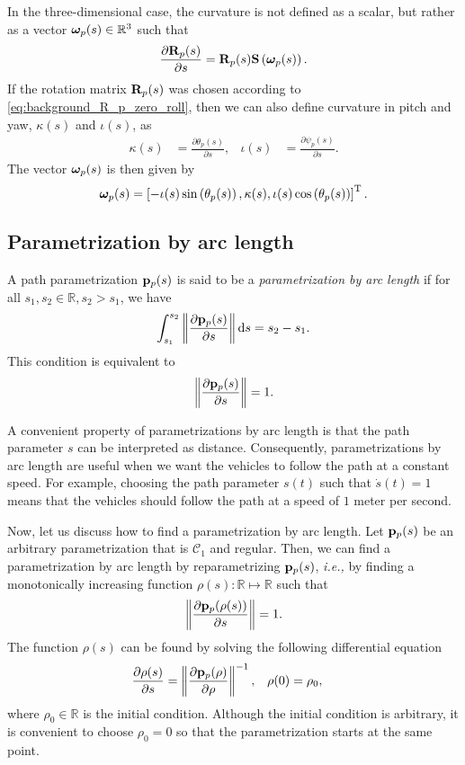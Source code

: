 In the three-dimensional case, the curvature is not defined as a scalar, but rather as a vector $\bm{\omega}_p(s) \in \mathbb{R}^3$ such that
\begin{equation}
    \frac{\partial \mathbf{R}_p(s)}{\partial s} = \mathbf{R}_p(s) \mathbf{S}\left(\bm{\omega}_p(s)\right).
\end{equation}
If the rotation matrix $\mathbf{R}_p(s)$ was chosen according to \eqref{eq:background_R_p_zero_roll}, then we can also define curvature in pitch and yaw, $\kappa(s)$ and $\iota(s)$, as
\begin{align}
    \kappa(s) &= \frac{\partial \theta_{p}(s)}{\partial s}, &
    \iota(s) &= \frac{\partial \psi_{p}(s)}{\partial s}.
\end{align}
The vector $\bm{\omega}_p(s)$ is then given by
\begin{equation}
    \bm{\omega}_p(s) = \left[-\iota(s)\sin\left(\theta_{p}(s)\right), \kappa(s), \iota(s)\cos\left(\theta_{p}(s)\right)\right]^{\mathrm{T}}.
\end{equation}

\subsection*{Parametrization by arc length}
A path parametrization $\mathbf{p}_p(s)$ is said to be a \emph{parametrization by arc length} if for all $s_1, s_2 \in \mathbb{R}, s_2 > s_1$, we have
\begin{equation}
    \int_{s_1}^{s_2} \left\|\frac{\partial \mathbf{p}_p(s)}{\partial s}\right\| {\rm d}s = s_2 - s_1.
\end{equation}
This condition is equivalent to
\begin{equation}
    \left\|\frac{\partial \mathbf{p}_p(s)}{\partial s}\right\| = 1.
\end{equation}

A convenient property of parametrizations by arc length is that the path parameter $s$ can be interpreted as distance.
Consequently, parametrizations by arc length are useful when we want the vehicles to follow the path at a constant speed.
For example, choosing the path parameter $s(t)$ such that $\dot{s}(t) = 1$ means that the vehicles should follow the path at a speed of $1$ meter per second.

Now, let us discuss how to find a parametrization by arc length.
Let $\mathbf{p}_p(s)$ be an arbitrary parametrization that is $\mathcal{C}_1$ and regular.
Then, we can find a parametrization by arc length by reparametrizing $\mathbf{p}_p(s)$, \emph{i.e.,} by finding a monotonically increasing function $\rho(s) : \mathbb{R} \mapsto \mathbb{R}$ such that
\begin{equation}
    \left\|\frac{\partial \mathbf{p}_p(\rho(s))}{\partial s}\right\| = 1.
\end{equation}
The function $\rho(s)$ can be found by solving the following differential equation
\begin{align}
    \frac{\partial \rho(s)}{\partial s} &= \left\|\frac{\partial \mathbf{p}_p(\rho)}{\partial \rho}\right\|^{-1}, &
    \rho(0) &= \rho_0,
\end{align}
where $\rho_0 \in \mathbb{R}$ is the initial condition.
Although the initial condition is arbitrary, it is convenient to choose $\rho_0 = 0$ so that the parametrization starts at the same point.
